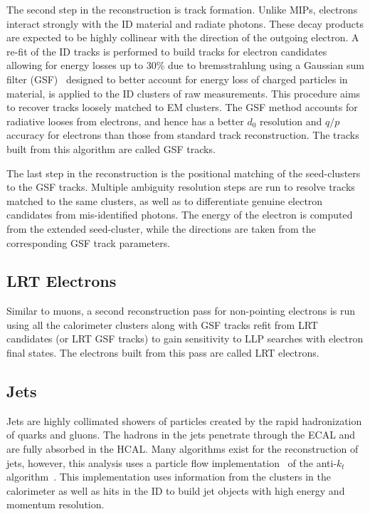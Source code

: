 The second step in the reconstruction is track formation. Unlike MIPs, electrons interact strongly with the ID material and radiate photons. These decay products are expected to be highly collinear with the direction of the outgoing electron. A re-fit of the ID tracks is performed to build tracks for electron candidates allowing for energy losses up to 30\% due to bremsstrahlung using a Gaussian sum filter (GSF)~\cite{ATLAS-CONF-2012-047} designed to better account for energy loss of charged particles in material, is applied to the ID clusters of raw measurements. This procedure aims to recover tracks loosely matched to EM clusters. The GSF method accounts for radiative looses from electrons, and hence has a better $d_0$ resolution and $q/p$ accuracy for electrons than those from standard track reconstruction. The tracks built from this algorithm are called GSF tracks.

The last step in the reconstruction is the positional matching of the seed-clusters to the GSF tracks. Multiple ambiguity resolution steps are run to resolve tracks matched to the same clusters, as well as to differentiate genuine electron candidates from mis-identified photons. The energy of the electron is computed from the extended seed-cluster, while the directions are taken from the corresponding GSF track parameters.

\subsection*{LRT Electrons}
Similar to muons, a second reconstruction pass for non-pointing electrons is run using all the calorimeter clusters along with GSF tracks refit from LRT candidates (or LRT GSF tracks) to gain sensitivity to LLP searches with electron final states. The electrons built from this pass are called LRT electrons.

\subsection{Jets}
Jets are highly collimated showers of particles created by the rapid hadronization of quarks and gluons. The hadrons in the jets penetrate through the ECAL and are fully absorbed in the HCAL. Many algorithms exist for the reconstruction of jets, however, this analysis uses a particle flow implementation~\cite{PERF-2015-09} of the anti-$k_t$ algorithm~\cite{anti-kT}. This implementation uses information from the clusters in the calorimeter as well as hits in the ID to build jet objects with high energy and momentum resolution.

